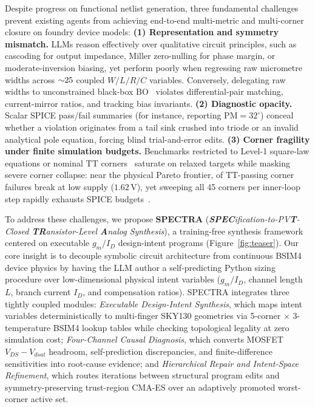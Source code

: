 Despite progress on functional netlist generation, three fundamental challenges prevent existing agents from achieving end-to-end multi-metric and multi-corner closure on foundry device models:
\textbf{(1) Representation and symmetry mismatch.} LLMs reason effectively over qualitative circuit principles, such as cascoding for output impedance, Miller zero-nulling for phase margin, or moderate-inversion biasing, yet perform poorly when regressing raw micrometre widths across ${\sim}25{}$ coupled $W/L/R/C$ variables. Conversely, delegating raw widths to unconstrained black-box BO~\cite{lai2026analogcoderpro} violates differential-pair matching, current-mirror ratios, and tracking bias invariants.
\textbf{(2) Diagnostic opacity.} Scalar SPICE pass/fail summaries (for instance, reporting $\text{PM}=32^\circ$) conceal whether a violation originates from a tail sink crushed into triode or an invalid analytical pole equation, forcing blind trial-and-error edits.
\textbf{(3) Corner fragility under finite simulation budgets.} Benchmarks restricted to Level-1 square-law equations or nominal TT corners~\cite{lai2025analogcoder,wang2025analogsage,habib2026aallm} saturate on relaxed targets while masking severe corner collapse: near the physical Pareto frontier, \PVTFailLowVdd{} of TT-passing corner failures break at low supply ($1.62\,\mathrm{V}$), yet sweeping all 45 corners per inner-loop step rapidly exhausts SPICE budgets~\cite{adbench2026longhorizon}.

To address these challenges, we propose \textbf{\textsc{SPECTRA}} (\emph{\textbf{SPEC}ifica\-tion-to-PV\textbf{T}-Closed \textbf{TR}ansistor-Level \textbf{A}nalog Synthesis}), a training-free synthesis framework centered on executable $g_m/I_D$ design-intent programs (Figure~\ref{fig:teaser}). Our core insight is to decouple symbolic circuit architecture from continuous BSIM4 device physics by having the LLM author a self-predicting Python sizing procedure over low-dimensional physical intent variables ($g_m/I_D$, channel length $L$, branch current $I_D$, and compensation ratios). \textsc{SPECTRA} integrates three tightly coupled modules: \emph{Executable Design-Intent Synthesis}, which maps intent variables deterministically to multi-finger SKY130 geometries via 5-corner $\times$ 3-temperature BSIM4 lookup tables while checking topological legality at zero simulation cost; \emph{Four-Channel Causal Diagnosis}, which converts MOSFET $V_{DS}-V_{dsat}$ headroom, self-prediction discrepancies, and finite-difference sensitivities into root-cause evidence; and \emph{Hierarchical Repair and Intent-Space Refinement}, which routes iterations between structural program edits and symmetry-preserving trust-region CMA-ES over an adaptively promoted worst-corner active set.

